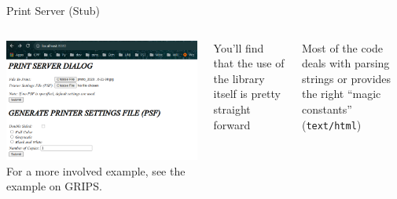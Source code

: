 \begin{frame}{Print Server (Stub)}
%
\begin{columns}[T]
\includegraphics[width=\linewidth]{./gfx/21-printer_server}
%
For a more involved example, see the example on GRIPS.

\vspace{6pt}
You'll find that the use of the library itself is pretty straight forward

\vspace{6pt}
Most of the code deals with parsing strings or provides the right \enquote{magic constants} (\zB \texttt{text/html})
\end{columns}
%
\end{frame}


